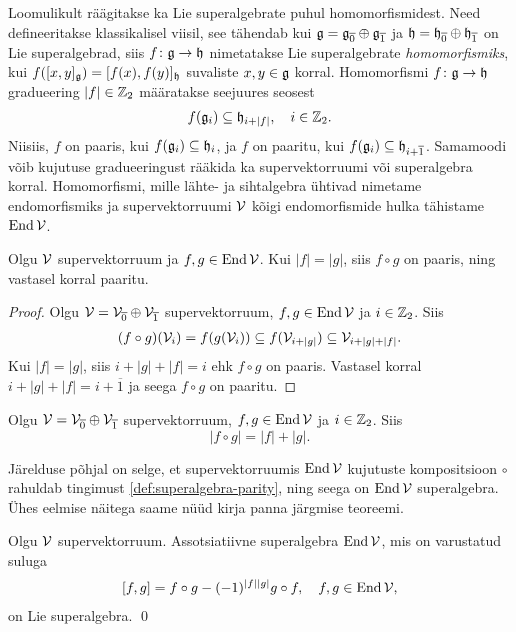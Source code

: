 Loomulikult räägitakse ka Lie superalgebrate puhul homomorfismidest. Need
defineeritakse klassikalisel viisil, see tähendab kui
$\mathfrak{g} = \mathfrak{g}_{\overline{0}} \oplus \mathfrak{g}_{\overline{1}}$ ja
$\mathfrak{h} = \mathfrak{h}_{\overline{0}} \oplus \mathfrak{h}_{\overline{1}}$
on Lie superalgebrad, siis $f \colon \mathfrak{g} \to \mathfrak{h}$ nimetatakse
Lie superalgebrate \emph{homomorfismiks}, kui
$f([x, y]_{\mathfrak{g}}) = [f(x), f(y)]_{\mathfrak{h}}$
suvaliste $x, y \in \mathfrak{g}$ korral. Homomorfismi $f \colon \mathfrak{g} \to \mathfrak{h}$
gradueering $|f| \in \mathbb{Z}_2$ määratakse seejuures seosest
\begin{align*}
    f(\mathfrak{g}_i) \subseteq \mathfrak{h}_{i + |f|}, \quad i \in \mathbb{Z}_2.
\end{align*}
Niisiis, $f$ on paaris, kui $f(\mathfrak{g}_i) \subseteq \mathfrak{h}_i$, ja $f$ on paaritu,
kui $f(\mathfrak{g}_i) \subseteq \mathfrak{h}_{i+\overline{1}}$. Samamoodi võib kujutuse
gradueeringust rääkida ka supervektorruumi või superalgebra korral.
Homomorfismi, mille lähte- ja sihtalgebra ühtivad nimetame endomorfismiks
ja supervektorruumi $\mathcal{V}$ kõigi endomorfismide hulka tähistame $\operatorname{End} \mathcal{V}$.

\begin{lemma}
    Olgu $\mathcal{V}$ supervektorruum ja $f, g \in \operatorname{End} \mathcal{V}$. Kui $|f| = |g|$,
    siis $f \circ g$ on paaris, ning vastasel korral paaritu.
\end{lemma}

\begin{proof}
    Olgu $\mathcal{V} = \mathcal{V}_{\overline{0}} \oplus \mathcal{V}_{\overline{1}}$ supervektorruum,
    $f, g \in \operatorname{End} \mathcal{V}$ ja $i \in \mathbb{Z}_2$. Siis
    \begin{align*}
        (f \circ g)(\mathcal{V}_i) = f(g(\mathcal{V}_i)) \subseteq
        f(\mathcal{V}_{i + |g|}) \subseteq \mathcal{V}_{i + |g| + |f|}.
    \end{align*}
    Kui $|f| = |g|$, siis $i + |g| + |f| = i$ ehk $f \circ g$ on paaris.
    Vastasel korral $i + |g| + |f| = i + \overline{1}$ ja seega
    $f \circ g$ on paaritu.
\end{proof}

\begin{jar}\label{lemma:kompositsiooni-paarsus}
    Olgu $\mathcal{V} = \mathcal{V}_{\overline{0}} \oplus \mathcal{V}_{\overline{1}}$
    supervektorruum, $f, g \in \operatorname{End} \mathcal{V}$ ja $i \in \mathbb{Z}_2$. Siis
    \[ |f \circ g| = |f| + |g|. \]
\end{jar}

Järelduse põhjal on selge, et supervektorruumis $\operatorname{End} \mathcal{V}$ kujutuste
kompositsioon $\circ$ rahuldab tingimust
\eqref{def:superalgebra-parity}, ning seega on $\operatorname{End} \mathcal{V}$
superalgebra. Ühes eelmise näitega saame nüüd kirja panna järgmise
teoreemi.

\begin{thm}
    Olgu $\mathcal{V}$ supervektorruum. Assotsiatiivne superalgebra
    $\operatorname{End} \mathcal{V}$, mis on varustatud suluga
    \begin{align}\label{eq:end_v_sulg}
        [f, g] = f \circ g - (-1)^{|f||g|} g \circ f, \quad f, g \in \operatorname{End} \mathcal{V},
    \end{align}
    on Lie superalgebra. \hfill \qed
\end{thm}

